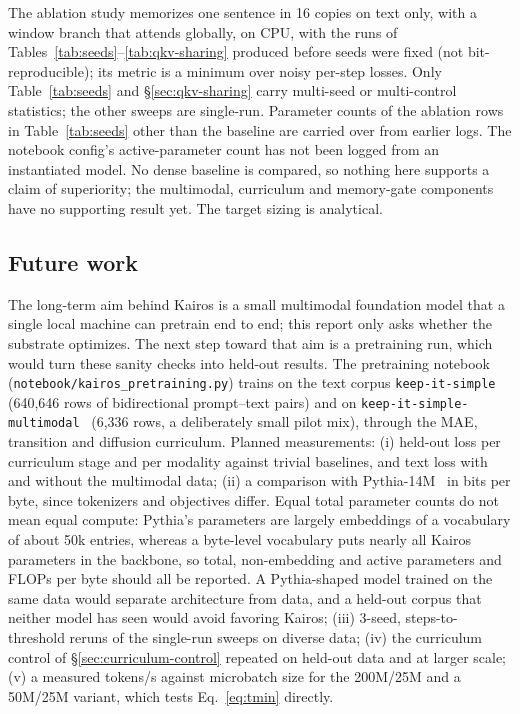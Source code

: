 \documentclass[11pt]{article}
\begin{document}
The ablation study memorizes one sentence in 16 copies on text only, with a window branch that
attends globally, on CPU, with the runs of Tables~\ref{tab:seeds}--\ref{tab:qkv-sharing} produced before seeds were fixed (not bit-reproducible); its metric is a minimum over
noisy per-step losses. Only Table~\ref{tab:seeds} and \S\ref{sec:qkv-sharing} carry multi-seed
or multi-control statistics; the other sweeps are single-run. Parameter counts of the ablation
rows in Table~\ref{tab:seeds} other than the baseline are carried over from earlier logs. The
notebook config's active-parameter count has not been logged from an instantiated model. No dense baseline
is compared, so nothing here supports a claim of superiority; the multimodal, curriculum and
memory-gate components have no supporting result yet. The target sizing is analytical.

\subsection{Future work}
\label{sec:future}

The long-term aim behind Kairos is a small multimodal foundation model that a single local
machine can pretrain end to end; this report only asks whether the substrate optimizes. The
next step toward that aim is a pretraining run, which would turn these sanity checks into
held-out results. The pretraining notebook (\texttt{notebook/kairos\_pretraining.py}) trains on the text corpus
\texttt{keep-it-simple}~\citep{keepitsimple2026} (640{,}646 rows of bidirectional
prompt--text pairs) and on \texttt{keep-it-simple-multimodal}~\citep{keepitsimplemm2026}
(6{,}336 rows, a deliberately small pilot mix), through the
MAE, transition and diffusion curriculum. Planned measurements: (i) held-out loss per curriculum
stage and per modality against trivial baselines, and text loss with and without the
multimodal data; (ii) a comparison with Pythia-14M~\citep{biderman2023pythia} in bits per byte,
since tokenizers and objectives differ. Equal total parameter counts do not mean equal compute:
Pythia's parameters are largely embeddings of a vocabulary of about 50k entries, whereas a
byte-level vocabulary puts nearly all Kairos parameters in the backbone, so total,
non-embedding and active parameters and FLOPs per byte should all be reported. A Pythia-shaped
model trained on the same data would separate architecture from data, and a held-out corpus
that neither model has seen would avoid favoring Kairos; (iii) 3-seed, steps-to-threshold
reruns of the single-run sweeps on diverse data; (iv) the curriculum control of \S\ref{sec:curriculum-control} repeated on held-out data and at larger scale; (v) a
measured tokens/s against microbatch size for the 200M/25M and a 50M/25M variant, which tests
Eq.~\ref{eq:tmin} directly.
\end{document}
